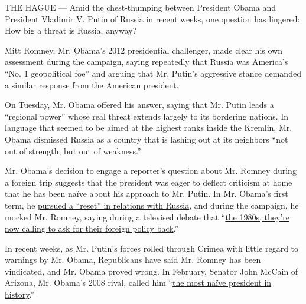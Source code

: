 THE HAGUE --- Amid the chest-thumping between President Obama and
President Vladimir V. Putin of Russia in recent weeks, one question has
lingered: How big a threat is Russia, anyway?

Mitt Romney, Mr. Obama's 2012 presidential challenger, made clear his
own assessment during the campaign, saying repeatedly that Russia was
America's ``No. 1 geopolitical foe'' and arguing that Mr. Putin's
aggressive stance demanded a similar response from the American
president.

On Tuesday, Mr. Obama offered his answer, saying that Mr. Putin leads a
``regional power'' whose real threat extends largely to its bordering
nations. In language that seemed to be aimed at the highest ranks inside
the Kremlin, Mr. Obama dismissed Russia as a country that is lashing out
at its neighbors ``not out of strength, but out of weakness.''

Mr. Obama's decision to engage a reporter's question about Mr. Romney
during a foreign trip suggests that the president was eager to deflect
criticism at home that he has been naïve about his approach to Mr.
Putin. In Mr. Obama's first term, he
\href{http://www.nytimes.com/2009/07/08/world/europe/08prexy.html?action=click\&module=Search\&region=searchResults\%230\&version=\&url=http\%3A\%2F\%2Fquery.nytimes.com\%2Fsearch\%2Fsitesearch\%2F\%3Faction\%3Dclick\%26region\%3DMasthead\%26pgtype\%3DHomepage\%26module\%3DSearchSubmit\%26contentCollection\%3DHomepage\%26t\%3Dqry436\%23\%2Fobama\%2520reset\%2520russia}{pursued
a ``reset'' in relations with Russia}, and during the campaign, he
mocked Mr. Romney, saying during a televised debate that
``\href{http://www.nytimes.com/2012/10/23/us/politics/obama-and-romney-meet-in-foreign-policy-debate.html?pagewanted=all\&action=click\&module=Search\&region=searchResults\%230\&version=\&url=http\%3A\%2F\%2Fquery.nytimes.com\%2Fsearch\%2Fsitesearch\%2F\%23\%2Fthe\%2B\%2B1980s\%2Bare\%2Bcalling\%2C\%2Bthey\%2Bwant\%2Btheir\%2B\%2Bforeign\%2Bpolicy\%2Bback.\%2F}{the
1980s, they're now calling to ask for their foreign policy back}.''

In recent weeks, as Mr. Putin's forces rolled through Crimea with little
regard to warnings by Mr. Obama, Republicans have said Mr. Romney has
been vindicated, and Mr. Obama proved wrong. In February, Senator John
McCain of Arizona, Mr. Obama's 2008 rival, called him
``\href{http://thehill.com/blogs/blog-briefing-room/news/198843-sen-mccain-obama-the-most-naive-president-in-history}{the
most naïve president in history}.''

